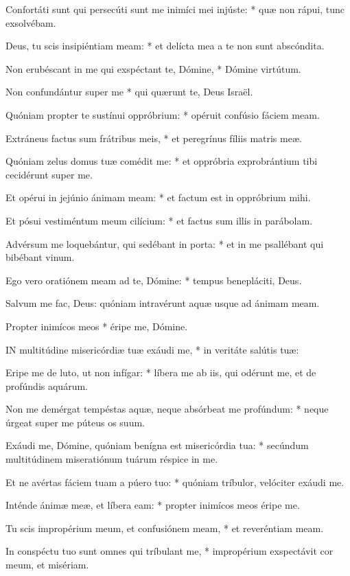 Confortáti sunt qui persecúti sunt me inimíci mei injúste: * quæ non rápui, tunc exsolvébam.

Deus, tu scis insipiéntiam meam: * et delícta mea a te non sunt abscóndita.

Non erubéscant in me qui exspéctant te, Dómine, * Dómine virtútum.

Non confundántur super me * qui quærunt te, Deus Israël.

Quóniam propter te sustínui oppróbrium: * opéruit confúsio fáciem meam.

Extráneus factus sum frátribus meis, * et peregrínus fíliis matris meæ.

Quóniam zelus domus tuæ comédit me: * et oppróbria exprobrántium tibi cecidérunt super me.

Et opérui in jejúnio ánimam meam: * et factum est in oppróbrium mihi.

Et pósui vestiméntum meum cilícium: * et factus sum illis in parábolam.

Advérsum me loquebántur, qui sedébant in porta: * et in me psallébant qui bibébant vinum.

Ego vero oratiónem meam ad te, Dómine: * tempus benepláciti, Deus.

 Salvum me fac, Deus: quóniam intravérunt aquæ usque ad ánimam meam.

 Propter inimícos meos * éripe me, Dómine.


\lettrine[lines=2]{I}{N} multitúdine misericórdiæ tuæ exáudi me, * in veritáte salútis tuæ:

Eripe me de luto, ut non infígar: * líbera me ab iis, qui odérunt me, et de profúndis aquárum.

Non me demérgat tempéstas aquæ, neque absórbeat me profúndum: * neque úrgeat super me púteus os suum.

Exáudi me, Dómine, quóniam benígna est misericórdia tua: * secúndum multitúdinem miseratiónum tuárum réspice in me.

Et ne avértas fáciem tuam a púero tuo: * quóniam tríbulor, velóciter exáudi me.

Inténde ánimæ meæ, et líbera eam: * propter inimícos meos éripe me.

Tu scis impropérium meum, et confusiónem meam, * et reveréntiam meam.

In conspéctu tuo sunt omnes qui tríbulant me, * impropérium exspectávit cor meum, et misériam.

